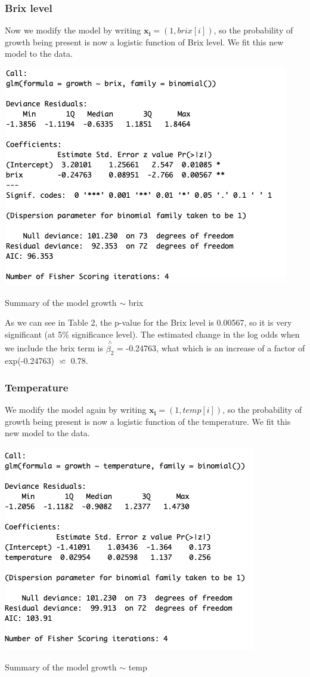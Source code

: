 \documentclass{article}
\begin{document}
\subsubsection{Brix level}
Now we modify the model by writing $ \boldsymbol{x_i}=(1,brix[i]) $, so the probability of growth being present is now a logistic function of Brix level. We fit this new model to the data. 

\begin{table}[h!]
\includegraphics[scale = 0.5]{table4.png}
\caption{Summary of the model growth $\sim$ brix}
\end{table}

As we can see in Table 2, the p-value for the Brix level is 0.00567, so it is very significant (at 5\% significance level). The estimated change in the log odds when we include the brix term is $\overset{\wedge}{\beta_2} $ = -0.24763, what which is an increase of a factor of exp(-0.24763) $\backsimeq $ 0.78.
\subsubsection{Temperature}
We modify the model again by writing $ \boldsymbol{x_i}=(1,temp[i]) $, so the probability of growth being present is now a logistic function of the temperature. We fit this new model to the data. 

\begin{table}[h!]
\includegraphics[scale = 0.5]{table3.png}
\caption{Summary of the model growth $\sim$ temp}
\end{table}
\end{document}
